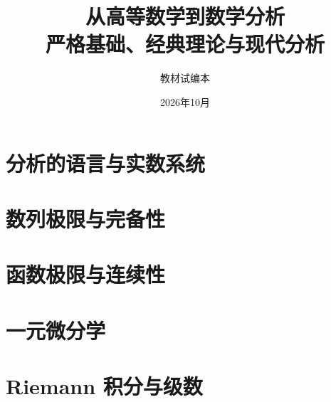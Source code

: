 \documentclass[UTF8,zihao=-4,openany,fontset=fandol]{ctexbook}
\title{\Huge\bfseries 从高等数学到数学分析\\[0.8em]\Large 严格基础、经典理论与现代分析}
\author{教材试编本}
\date{2026年10月}
\begin{document}
\frontmatter
\maketitle



\tableofcontents

\mainmatter
\setcounter{chapter}{-1}

\part{分析的语言与实数系统}





\part{数列极限与完备性}









\part{函数极限与连续性}





\part{一元微分学}






\part{Riemann 积分与级数}






\end{document}
